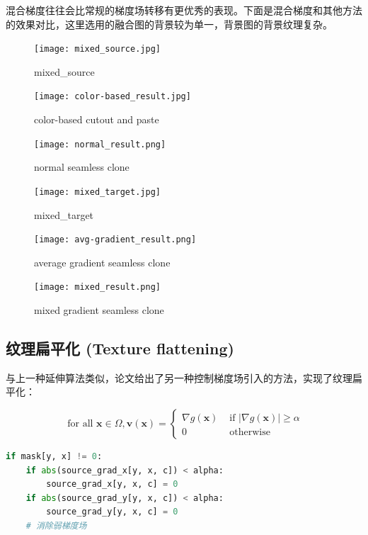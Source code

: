 \documentclass[lang=cn,11pt,a4paper]{elegantpaper}
\begin{document}
混合梯度往往会比常规的梯度场转移有更优秀的表现。下面是混合梯度和其他方法的效果对比，这里选用的融合图的背景较为单一，背景图的背景纹理复杂。

\begin{figure}[ht]
	\centering
	\begin{minipage}{0.2\linewidth}
		\centering
		\texttt{[image: mixed\_source.jpg]}
		\caption{mixed\_source}
	\end{minipage}
	\begin{minipage}{0.38\linewidth}
		\centering
		\texttt{[image: color-based\_result.jpg]}
		\caption{color-based cutout and paste}
	\end{minipage}
	\begin{minipage}{0.38\linewidth}
		\centering
		\texttt{[image: normal\_result.png]}
		\caption{normal seamless clone}
	\end{minipage}
	
	\begin{minipage}{0.2\linewidth}
		\centering
		\texttt{[image: mixed\_target.jpg]}
		\caption{mixed\_target}
	\end{minipage}
	\begin{minipage}{0.38\linewidth}
		\centering
		\texttt{[image: avg-gradient\_result.png]}
		\caption{average gradient seamless clone}
	\end{minipage}
	\begin{minipage}{0.38\linewidth}
		\centering
		\texttt{[image: mixed\_result.png]}
		\caption{mixed gradient seamless clone}
	\end{minipage}
\end{figure}

\subsection{纹理扁平化 (Texture flattening)}

与上一种延伸算法类似，论文给出了另一种控制梯度场引入的方法，实现了纹理扁平化：

\begin{equation}
    \text { for all } \mathbf{x} \in \Omega, \mathbf{v}(\mathbf{x})= \begin{cases}\nabla g(\mathbf{x}) & \text { if }\left|\nabla g(\mathbf{x})\right| \geq \alpha \\ 0 & \text { otherwise }\end{cases}
\end{equation}

\begin{lstlisting}[language=Python]
if mask[y, x] != 0:
    if abs(source_grad_x[y, x, c]) < alpha:
        source_grad_x[y, x, c] = 0
    if abs(source_grad_y[y, x, c]) < alpha:
        source_grad_y[y, x, c] = 0
    # 消除弱梯度场
\end{lstlisting}
\end{document}
